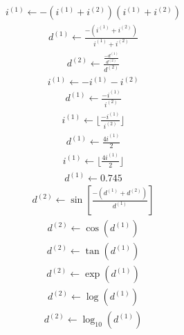 \documentclass[a4paper,fleqn]{ltjsarticle}
\begin{document}
  \begin{align}
  i^{(1)} \leftarrow -\left(i^{(1)}+i^{(2)}\right) \left(i^{(1)}+i^{(2)}\right)
  \end{align}
  \begin{align}
  d^{(1)} \leftarrow \frac{\displaystyle -\left(i^{(1)}+i^{(2)}\right)}{\displaystyle i^{(1)}+i^{(2)}}
  \end{align}
  \begin{align}
  d^{(2)} \leftarrow \frac{\displaystyle \frac{\displaystyle -d^{(1)}}{\displaystyle d^{(2)}}}{\displaystyle d^{(2)}}
  \end{align}
  \begin{align}
  i^{(1)} \leftarrow -i^{(1)}-i^{(2)}
  \end{align}
  \begin{align}
  d^{(1)} \leftarrow \frac{\displaystyle -i^{(1)}}{\displaystyle i^{(2)}}
  \end{align}
  \begin{align}
  i^{(1)} \leftarrow \lfloor \frac{\displaystyle -i^{(1)}}{\displaystyle i^{(2)}}\rfloor
  \end{align}
  \begin{align}
  d^{(1)} \leftarrow \frac{\displaystyle 4 i^{(1)}}{\displaystyle 2}
  \end{align}
  \begin{align}
  i^{(1)} \leftarrow \lfloor \frac{\displaystyle 4 i^{(1)}}{\displaystyle 2}\rfloor
  \end{align}
  \begin{align}
  d^{(1)} \leftarrow 0.745
  \end{align}
  \begin{align}
  d^{(2)} \leftarrow \sin\left[\frac{\displaystyle -\left(d^{(1)}+d^{(2)}\right)}{\displaystyle d^{(1)}}\right]
  \end{align}
  \begin{align}
  d^{(2)} \leftarrow \cos\left(d^{(1)}\right)
  \end{align}
  \begin{align}
  d^{(2)} \leftarrow \tan\left(d^{(1)}\right)
  \end{align}
  \begin{align}
  d^{(2)} \leftarrow \exp\left(d^{(1)}\right)
  \end{align}
  \begin{align}
  d^{(2)} \leftarrow \log\left(d^{(1)}\right)
  \end{align}
  \begin{align}
  d^{(2)} \leftarrow \log_{10}\left(d^{(1)}\right)
  \end{align}
\end{document}
